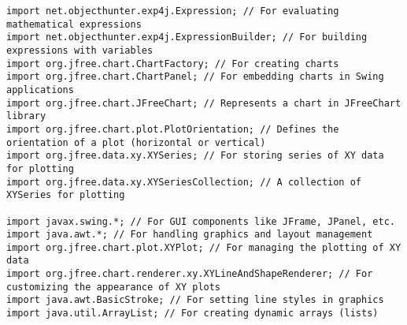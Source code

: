 \begin{lstlisting}[style=JavaStyle, caption={Used Libraries}]
import net.objecthunter.exp4j.Expression; // For evaluating mathematical expressions
import net.objecthunter.exp4j.ExpressionBuilder; // For building expressions with variables
import org.jfree.chart.ChartFactory; // For creating charts
import org.jfree.chart.ChartPanel; // For embedding charts in Swing applications
import org.jfree.chart.JFreeChart; // Represents a chart in JFreeChart library
import org.jfree.chart.plot.PlotOrientation; // Defines the orientation of a plot (horizontal or vertical)
import org.jfree.data.xy.XYSeries; // For storing series of XY data for plotting
import org.jfree.data.xy.XYSeriesCollection; // A collection of XYSeries for plotting

import javax.swing.*; // For GUI components like JFrame, JPanel, etc.
import java.awt.*; // For handling graphics and layout management
import org.jfree.chart.plot.XYPlot; // For managing the plotting of XY data
import org.jfree.chart.renderer.xy.XYLineAndShapeRenderer; // For customizing the appearance of XY plots
import java.awt.BasicStroke; // For setting line styles in graphics
import java.util.ArrayList; // For creating dynamic arrays (lists)
        \end{lstlisting}
        